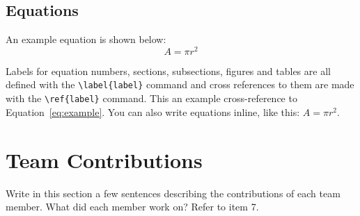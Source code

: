 \documentclass[11pt]{article}
\begin{document}
\subsection{Equations}

An example equation is shown below:
\begin{equation}
  \label{eq:example}
  A = \pi r^2
\end{equation}

Labels for equation numbers, sections, subsections, figures and tables
are all defined with the \verb|\label{label}| command and cross references
to them are made with the \verb|\ref{label}| command.
This an example cross-reference to Equation~\ref{eq:example}. You can also write equations inline, like this: $A=\pi r^2$.



\section*{Team Contributions}

Write in this section a few sentences describing the contributions of each team member. What did each member work on? Refer to item 7.

%





\end{document}
